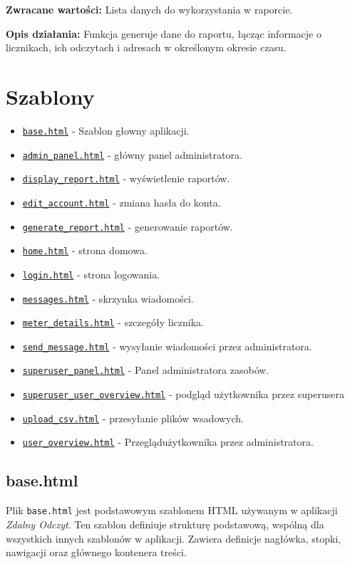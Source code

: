\documentclass[12pt,a4paper]{report}
\begin{document}
\textbf{Zwracane wartości:} Lista danych do wykorzystania w raporcie.

\textbf{Opis działania:}
Funkcja generuje dane do raportu, łącząc informacje o licznikach, ich odczytach i adresach w określonym okresie czasu.
\newpage
\chapter{Szablony}
\label{sec:templates}
 \begin{itemize}
        \item \hyperref[sec:base]{\texttt{base.html}} - Szablon głowny aplikacji.
        \item \hyperref[sec:adminpanel]{\texttt{admin\_panel.html}} - główny panel administratora.
        \item \hyperref[sec:displayreport]{\texttt{display\_report.html}} - wyświetlenie raportów.
        \item \hyperref[sec:editaccount]{\texttt{edit\_account.html}} - zmiana hasła do konta.
        \item \hyperref[sec:generatereport]{\texttt{generate\_report.html}} - generowanie raportów.
        \item \hyperref[sec:home]{\texttt{home.html}} - strona domowa.
        \item \hyperref[sec:login]{\texttt{login.html}} - strona logowania.
        \item \hyperref[sec:messages]{\texttt{messages.html}} - skrzynka wiadomości.
        \item \hyperref[sec:meterdetails]{\texttt{meter\_details.html}} - szczegóły licznika.
        \item \hyperref[sec:sendmessage]{\texttt{send\_message.html}} - wysyłanie wiadomości przez administratora.
        \item \hyperref[sec:superuserpanel]{\texttt{superuser\_panel.html}} - Panel administratora zasobów.
        \item \hyperref[sec:superuseruseroverview]{\texttt{superuser\_user\_overview.html}} - podgląd użytkownika przez superusera
        \item \hyperref[sec:uploadcsv]{\texttt{upload\_csv.html}} - przesyłanie plików wsadowych.
        \item \hyperref[sec:useroverview]{\texttt{user\_overview.html}} - Przeglądużytkownika przez administratora.
    \end{itemize}
\section{base.html}
\label{sec:base}
Plik \texttt{base.html} jest podstawowym szablonem HTML używanym w aplikacji \textit{Zdalny Odczyt}. Ten szablon definiuje strukturę podstawową, wspólną dla wszystkich innych szablonów w aplikacji. Zawiera definicje nagłówka, stopki, nawigacji oraz głównego kontenera treści.
\end{document}
